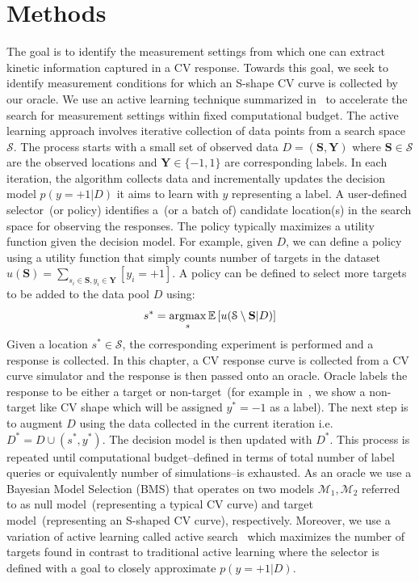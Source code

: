 \section{Methods}
The goal is to identify the measurement settings from which one can extract kinetic information captured in a CV response.
Towards this goal, we seek to identify measurement conditions for which an S-shape CV curve is collected by our oracle. 
We use an active learning technique summarized in~ to accelerate the search for measurement settings within fixed computational budget. 
The active learning approach involves iterative collection of data points from a search space \(\mathcal{S}\).
The process starts with a small set of observed data \(D=(\textbf{S},\textbf{Y})\) where \(\textbf{S}\in\mathcal{S}\) are the observed locations and \(\textbf{Y}\in\{-1,1\}\) are corresponding labels. 
In each iteration, the algorithm collects data and incrementally updates the decision model \(p(y=+1|D)\) it aims to learn with \(y\) representing a label.
A user-defined selector~(or policy) identifies a~(or a batch of) candidate location(s) in the search space for observing the responses.
The policy typically maximizes a utility function given the decision model. 
For example, given \(D\), we can define a policy using a utility function that simply counts number of targets in the dataset \(u(\textbf{S})=\sum\limits_{s_i\in \textbf{S}, y_i \in \textbf{Y}} [y_i=+1]\). 
A policy can be defined to select more targets to be added to the data pool \(D\) using: 
\begin{equation}
    s^* = \operatorname*{argmax}_s \mathbb{E}\left[ u(\mathcal{S} \setminus \textbf{S} | D )\right] 
    \label{eq:policy}
\end{equation}
Given a location \(s^* \in\mathcal{S}\), the corresponding experiment is performed and a response is collected. 
In this chapter, a CV response curve is collected from a CV curve simulator and the response is then passed onto an oracle. 
Oracle labels the response to be either a target or non-target~(for example in~, we show a non-target like CV shape which will be  assigned \(y^*=-1\) as a label). 
The next step is to augment \(D\) using the data collected in the current iteration i.e. \(D^* = D\cup (s^*,y^*) \). 
The decision model is then updated with \(D^*\). 
This process is repeated until computational budget--defined in terms of total number of label queries or equivalently number of simulations--is exhausted.
As an oracle we use a Bayesian Model Selection (BMS) that operates on two models \(\mathcal{M}_1, \mathcal{M}_2\) referred to as null model~(representing a typical CV curve) and target model~(representing an S-shaped CV curve), respectively.
Moreover, we use a variation of active learning called active search~\cite{garnett2012bayesian} which maximizes the number of targets found in contrast to traditional active learning where the selector is defined with a goal to closely approximate \(p(y=+1\vert D )\).


